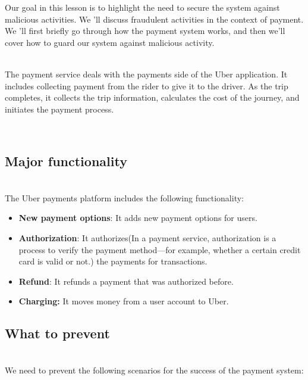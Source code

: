 

Our goal in this lesson is to highlight the need to secure the system against malicious activities. We 'll discuss fraudulent activities in the context of payment. We
'll first briefly go through how the payment system works, and then we'll cover how to guard our system against malicious activity.\\
\strut \\
The payment service deals with the payments side of the Uber application. It includes collecting payment from the rider to give it to the driver. As the trip completes, it collects the trip information, calculates the cost of the journey, and initiates the payment process.\\
\strut \\

\subsection{Major functionality}\label{7y4n6gV93bnGxlHfoJd6F}
\\
The Uber payments platform includes the following functionality:

\begin{itemize}
\item
\protect{}\label{JUZ_JQPDyCovlvyQlNABj}
\textbf{New payment options}: It adds new payment options for users.
\item
\protect{}\label{9VDD3jR9fBPm-CcElrisr}
\textbf{Authorization}: It authorizes(In a payment service, authorization is a process to verify the payment method---for example, whether a certain credit card is valid or not.) the payments for transactions.
\item
\protect{}\label{15DnkFXMXXN-cBTnW_Yey}
\textbf{Refund}: It refunds a payment that was authorized before.
\item
\protect{}\label{XO5U_XqDlBkhy-9BqWEuT}
\textbf{Charging:} It moves money from a user account to Uber.
\end{itemize}

\subsection{What to prevent}\label{s4_38XyvGg3NrpWB6B1jJ}
\\
We need to prevent the following scenarios for the success of the payment system:


